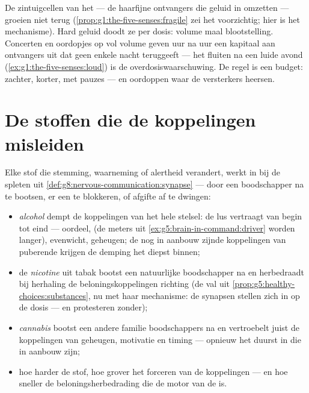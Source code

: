 \begin{proposition}\label{prop:g8:protecting-the-nervous-system:noise}
De zintuigcellen van het  --- de haarfijne ontvangers die geluid in
 omzetten --- groeien niet terug
(\cref{prop:g1:the-five-senses:fragile} zei het voorzichtig; hier is het
mechanisme). Hard geluid doodt ze per dosis: volume maal blootstelling.
Concerten en oordopjes op vol volume geven uur na uur een kapitaal aan
ontvangers uit dat geen enkele nacht  teruggeeft --- het fluiten na
een luide avond (\cref{ex:g1:the-five-senses:loud}) is de
overdosiswaarschuwing. De regel is een budget: zachter, korter, met pauzes
--- en oordoppen waar de versterkers heersen.
\end{proposition}
\admitted

\section{De stoffen die de koppelingen misleiden}

\begin{proposition}\label{prop:g8:protecting-the-nervous-system:substances}
Elke stof die stemming, waarneming of alertheid verandert, werkt in bij de
spleten uit \cref{def:g8:nervous-communication:synapse} --- door een
boodschapper na te bootsen, er een te blokkeren, of afgifte af te dwingen:
\begin{itemize}
  \item \emph{alcohol} dempt de koppelingen van het hele stelsel: de lus
        vertraagt van begin tot eind --- oordeel,  (de meters
        uit \cref{ex:g5:brain-in-command:driver} worden langer), evenwicht,
        geheugen; de nog in aanbouw zijnde koppelingen van puberende
         krijgen de demping het diepst binnen;
  \item de \emph{nicotine} uit tabak bootst een natuurlijke boodschapper
        na en herbedraadt bij herhaling de beloningskoppelingen richting
        \emph{} (de val uit
        \cref{prop:g5:healthy-choices:substances}, nu met haar mechanisme:
        de synapsen stellen zich in op de dosis --- en protesteren zonder);
  \item \emph{cannabis} bootst een andere familie boodschappers na en
        vertroebelt juist de koppelingen van geheugen, motivatie en timing
        --- opnieuw het duurst in  die in aanbouw zijn;
  \item hoe harder de stof, hoe grover het forceren van de koppelingen ---
        en hoe sneller de beloningsherbedrading die de motor van de
         is.
\end{itemize}
\end{proposition}
\admitted


